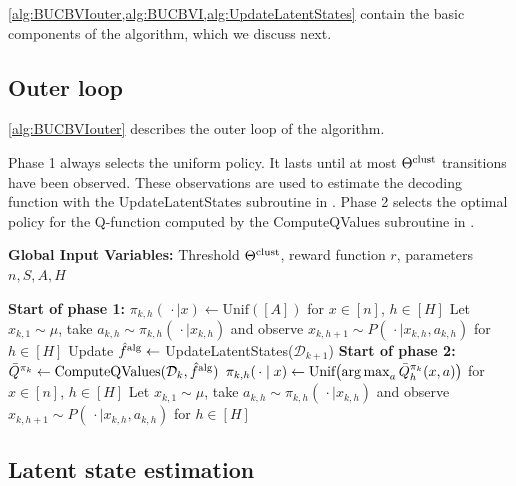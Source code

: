 \documentclass[11pt]{article}
\newcommand{\mcD}{\mathcal{D}}
\newcommand{\clust}{\textnormal{clust}}
\newcommand{\alg}{\textnormal{alg}}
\DeclareMathOperator*{\argmax}{arg\,max}
\theoremstyle{definition}
\theoremstyle{definition}
\begin{document}
\cref{alg:BUCBVIouter,alg:BUCBVI,alg:UpdateLatentStates} contain the basic components of the algorithm, which we discuss next.

\subsection{Outer loop}

\cref{alg:BUCBVIouter} describes the outer loop of the algorithm.

Phase 1 always selects the uniform policy.
It lasts until at most $\Theta^{\clust}$ transitions have been observed.
These observations are used to estimate the decoding function with the UpdateLatentStates subroutine in .
Phase 2 selects the optimal policy for the Q-function computed by the ComputeQValues subroutine in .

\begin{algorithm}
	\textbf{Global Input Variables:} Threshold $\Theta^{\clust}$, reward function $r$, parameters $n,S,A,H$
	\begin{algorithmic}[1]
		\State  \textbf{Start of phase 1:}
		\For{$k>0:T_k\leq \Theta^{\clust}$}
		\State $\pi_{k,h}(\, \cdot \mid  x) \gets \text{Unif}([A])$ for $x\in[n]$, $h\in[H]$ \label{ln:uniform_policy}
		\State Let $x_{k,1}\sim \mu$, take $a_{k,h}\sim \pi_{k,h}(\, \cdot \mid  x_{k,h})$ and observe $x_{k,h+1}\sim P(\, \cdot \mid  x_{k,h},a_{k,h})$ for $h\in[H]$
		\EndFor
		\State Update $\hat{f}^{\alg}\gets$ UpdateLatentStates($\mcD_{k+1}$)
		\State  \textbf{Start of phase 2:}
		\For{$k>0:T_k>\Theta^{\clust}$}
		\State $\bar{Q}^{\pi_k}\gets \text{ComputeQValues}(\mcD_{k},\hat{f}^{\alg})$ 
		\State $\pi_{k,h}(\, \cdot \mid  x)\gets \textnormal{Unif}\bigl( \argmax_{a}\bar{Q}^{\pi_k}_{h}(x,a)\bigr)$ for $x\in[n]$, $h\in[H]$
		\State Let $x_{k,1}\sim \mu$, take $a_{k,h}\sim \pi_{k,h}(\, \cdot \mid  x_{k,h})$ and observe $x_{k,h+1}\sim P(\, \cdot \mid  x_{k,h},a_{k,h})$ for $h\in[H]$
		\EndFor
	\end{algorithmic}
	\caption{Pseudocode for the outer loop.
	}\label{alg:BUCBVIouter}
\end{algorithm}

\subsection{Latent state estimation}
\end{document}
